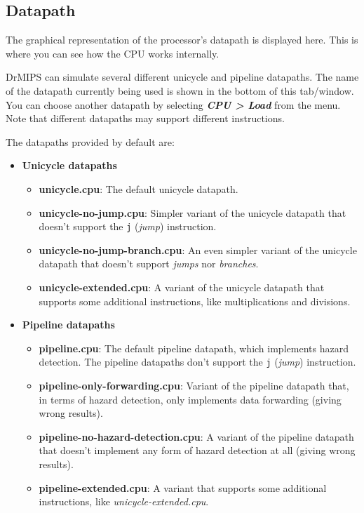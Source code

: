 \documentclass[11pt,a4paper,twoside,titlepage]{article}
\newcommand{\menupath}[1]{\textbf{\emph{#1}}}
\begin{document}
\subsection{Datapath}

The graphical representation of the processor's datapath is displayed here.
This is where you can see how the CPU works internally.

DrMIPS can simulate several different unicycle and pipeline datapaths.
The name of the datapath currently being used is shown in the bottom of this
tab/window. You can choose another datapath by selecting 
\menupath{CPU > Load} from the menu.
Note that different datapaths may support different instructions.

The datapaths provided by default are:
\begin{itemize}
	\item \textbf{Unicycle datapaths}
	\begin{itemize}
		\item \textbf{unicycle.cpu}: The default unicycle datapath.
		\item \textbf{unicycle-no-jump.cpu}: Simpler variant of the unicycle 
			datapath that doesn't support the \verb+j+ (\emph{jump}) 
			instruction.
		\item \textbf{unicycle-no-jump-branch.cpu}: An even simpler variant 
			of the unicycle datapath that doesn't support \emph{jumps} nor
			\emph{branches}.
		\item \textbf{unicycle-extended.cpu}: A variant of the unicycle 
			datapath that supports some additional instructions, like 
			multiplications and divisions.
	\end{itemize}
	
	\item \textbf{Pipeline datapaths}
	\begin{itemize}
		\item \textbf{pipeline.cpu}: The default pipeline datapath, which
			implements hazard detection. The pipeline datapaths don't
			support the \verb+j+ (\emph{jump}) instruction.
		\item \textbf{pipeline-only-forwarding.cpu}: Variant of the pipeline
			datapath that, in terms of hazard detection, only implements
			data forwarding (giving wrong results).
		\item \textbf{pipeline-no-hazard-detection.cpu}: A variant of the
			pipeline datapath that doesn't implement any form of hazard 
			detection at all (giving wrong results).
		\item \textbf{pipeline-extended.cpu}: A variant that supports some
			additional instructions, like \emph{unicycle-extended.cpu}.
	\end{itemize}
\end{itemize}
\end{document}
